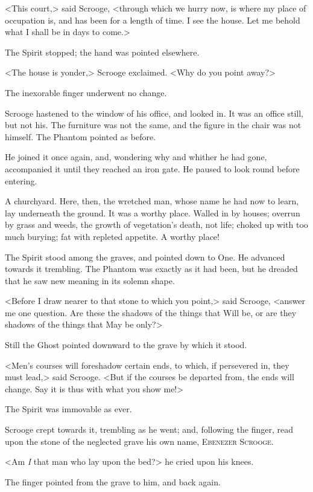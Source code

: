 <This court,> said Scrooge, <through which we hurry now, is where my place of
occupation is, and has been for a length of time. I see the house. Let me behold
what I shall be in days to come.>

The Spirit stopped; the hand was pointed elsewhere.

<The house is yonder,> Scrooge exclaimed. <Why do you point away?>

The inexorable finger underwent no change.

Scrooge hastened to the window of his office, and looked in. It was an office
still, but not his. The furniture was not the same, and the figure in the chair
was not himself. The Phantom pointed as before.

He joined it once again, and, wondering why and whither he had gone, accompanied
it until they reached an iron gate. He paused to look round before entering.

A churchyard. Here, then, the wretched man, whose name he had now to learn, lay
underneath the ground. It was a worthy place. Walled in by houses; overrun by
grass and weeds, the growth of vegetation's death, not life; choked up with too
much burying; fat with repleted appetite. A worthy place!

The Spirit stood among the graves, and pointed down to One. He advanced towards
it trembling. The Phantom was exactly as it had been, but he dreaded that he saw
new meaning in its solemn shape.

<Before I draw nearer to that stone to which you point,> said Scrooge, <answer
me one question. Are these the shadows of the things that Will be, or are they
shadows of the things that May be only?>

Still the Ghost pointed downward to the grave by which it stood.

<Men's courses will foreshadow certain ends, to which, if persevered in, they
must lead,> said Scrooge. <But if the courses be departed from, the ends will
change. Say it is thus with what you show me!>

The Spirit was immovable as ever.

Scrooge crept towards it, trembling as he went; and, following the finger, read
upon the stone of the neglected grave his own name, \textsc{Ebenezer Scrooge}.

<Am \emph{I} that man who lay upon the bed?> he cried upon his knees.

The finger pointed from the grave to him, and back again.

